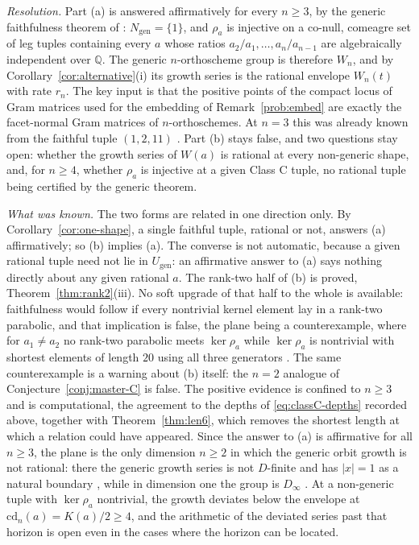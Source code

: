 \documentclass[11pt,a4paper]{article}
\newcommand{\Q}{\mathbb{Q}}
\newcommand{\cd}{\mathrm{cd}}
\theoremstyle{definition}
\theoremstyle{remark}
\theoremstyle{plain}
\begin{document}
\emph{Resolution.} Part (a) is answered affirmatively for every $n\ge3$, by the generic
faithfulness theorem of \cite{Bonfioli3}: $N_{\mathrm{gen}}=\{1\}$, and $\rho_a$ is injective on a
co-null, comeagre set of leg tuples containing every $a$ whose ratios $a_2/a_1,\dots,a_n/a_{n-1}$
are algebraically independent over $\Q$. The generic $n$-orthoscheme group is therefore $W_n$, and
by Corollary~\ref{cor:alternative}(i) its growth series is the rational envelope $W_n(t)$ with
rate $r_n$. The key input is that the positive points of the compact locus of Gram matrices used
for the embedding of Remark~\ref{prob:embed} are exactly the facet-normal Gram matrices of
$n$-orthoschemes. At $n=3$ this was already known from the faithful tuple $(1,2,11)$
\cite{Bonfioli3}. Part (b) stays false, and two questions stay open: whether the growth series of
$W(a)$ is rational at every non-generic shape, and, for $n\ge4$, whether $\rho_a$ is injective at a
given Class C tuple, no rational tuple being certified by the generic theorem.

\emph{What was known.} The two forms are related in one direction only. By
Corollary~\ref{cor:one-shape}, a single faithful tuple, rational or not, answers (a)
affirmatively; so (b) implies (a). The converse is not automatic, because a given rational tuple
need not lie in $U_{\mathrm{gen}}$: an affirmative answer to (a) says nothing directly about any
given rational $a$. The rank-two half
of (b) is proved, Theorem~\ref{thm:rank2}(iii). No soft upgrade of that half to the whole is
available: faithfulness would follow if every nontrivial kernel element lay in a rank-two
parabolic, and that implication is false, the plane being a counterexample, where for
$a_1\ne a_2$ no rank-two parabolic meets $\ker\rho_a$ while $\ker\rho_a$ is nontrivial with
shortest elements of length $20$ using all three generators \cite{Bonfioli1}. The same
counterexample is a warning about (b) itself: the $n=2$ analogue of
Conjecture~\ref{conj:master-C} is false. The positive evidence is confined to $n\ge3$ and is
computational, the agreement to the depths of \eqref{eq:classC-depths} recorded above, together with
Theorem~\ref{thm:len6}, which removes the shortest length at which a relation could have
appeared. Since the answer to (a) is affirmative for all $n\ge3$, the plane is the only dimension
$n\ge2$ in which the generic orbit growth is not rational: there the generic growth series is not
$D$-finite and has $|x|=1$ as a natural boundary \cite{Bonfioli2}, while in dimension one the group
is $D_\infty$ \cite{Bonfioli3}. At a non-generic tuple with $\ker\rho_a$ nontrivial, the growth
deviates below the envelope at $\cd_n(a)=K(a)/2\ge4$, and the arithmetic of the deviated series
past that horizon is open even in the cases where the horizon can be located.
\end{document}
